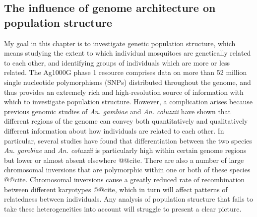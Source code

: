 \documentclass[a4paper,11pt,abstracton,hidelinks]{scrartcl}
\begin{document}
\subsection{The influence of genome architecture on population structure}\label{subsec:treescan}


My goal in this chapter is to investigate genetic population structure, which means studying the extent to which individual mosquitoes are genetically related to each other, and identifying groups of individuals which are more or less related.
%
The Ag1000G phase 1 resource comprises data on more than 52 million single nucleotide polymorphisms (SNPs) distributed throughout the genome, and thus provides an extremely rich and high-resolution source of information with which to investigate population structure.
%
However, a complication arises because previous genomic studies of \textit{An. gambiae} and \textit{An. coluzzii} have shown that different regions of the genome can convey both quantitatively and qualitatively  different information about how individuals are related to each other.
%
In particular, several studies have found that differentiation between the two species \textit{An. gambiae} and \textit{An. coluzzii} is particularly high within certain genome regions but lower or almost absent elsewhere @@cite.
%
There are also a number of large chromosomal inversions that are polymorphic within one or both of these species @@cite.
%
Chromosomal inversions cause a greatly reduced rate of recombination between different karyotypes @@cite, which in turn will affect patterns of relatedness between individuals.
%
Any analysis of population structure that fails to take these heterogeneities into account will struggle to present a clear picture.
%
\end{document}
